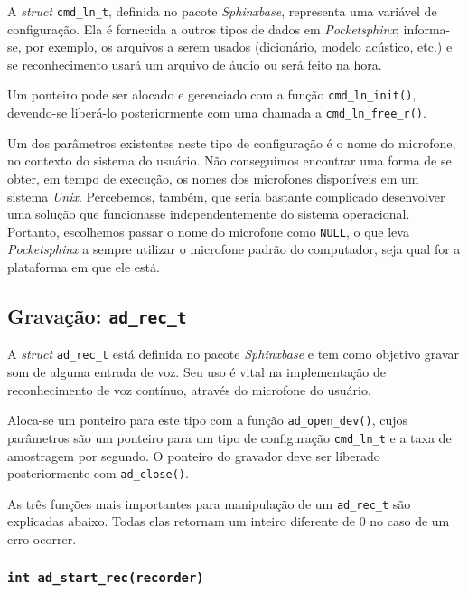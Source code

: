 A \textit{struct} \texttt{cmd\_ln\_t}, definida no pacote \textit{Sphinxbase}, representa uma variável de configuração. Ela é fornecida a outros tipos de dados em \textit{Pocketsphinx}; informa-se, por exemplo, os arquivos a serem usados (dicionário, modelo acústico, etc.) e se reconhecimento usará um arquivo de áudio ou será feito na hora.

Um ponteiro pode ser alocado e gerenciado com a função \texttt{cmd\_ln\_init()}, devendo-se liberá-lo posteriormente com uma chamada a \texttt{cmd\_ln\_free\_r()}.

Um dos parâmetros existentes neste tipo de configuração é o nome do microfone, no contexto do sistema do usuário. Não conseguimos encontrar uma forma de se obter, em tempo de execução, os nomes dos microfones disponíveis em um sistema \textit{Unix}. Percebemos, também, que seria bastante complicado desenvolver uma solução que funcionasse independentemente do sistema operacional. Portanto, escolhemos passar o nome do microfone como \texttt{NULL}, o que leva \textit{Pocketsphinx} a sempre utilizar o microfone padrão do computador, seja qual for a plataforma em que ele está.


\subsection{Gravação: \texttt{ad\_rec\_t}}

A \textit{struct} \texttt{ad\_rec\_t} está definida no pacote \textit{Sphinxbase} e tem como objetivo gravar som de alguma entrada de voz. Seu uso é vital na implementação de reconhecimento de voz contínuo, através do microfone do usuário.

Aloca-se um ponteiro para este tipo com a função \texttt{ad\_open\_dev()}, cujos parâmetros são um ponteiro para um tipo de configuração \texttt{cmd\_ln\_t} e a taxa de amostragem por segundo. O ponteiro do gravador deve ser liberado posteriormente  com \texttt{ad\_close()}.

As três funções mais importantes para manipulação de um \texttt{ad\_rec\_t} são explicadas abaixo. Todas elas retornam um inteiro diferente de 0 no caso de um erro ocorrer.

\subsubsection{\texttt{int ad\_start\_rec(recorder)}}

